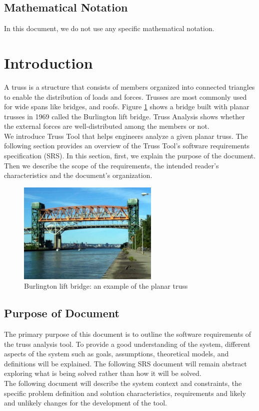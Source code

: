 \documentclass[12pt]{article}
\begin{document}
\subsection{Mathematical Notation}
In this document, we do not use any specific mathematical notation.

\newpage


\section{Introduction}
{A truss is a structure that consists of members organized into connected triangles to enable the distribution of loads and forces. Trusses are most commonly used for wide spans like bridges, and roofs. Figure \ref{Fig_bridge} shows a bridge built with planar trusses in 1969 called the Burlington lift bridge. Truss Analysis shows whether the external forces are well-distributed among the members or not. \\
We introduce Truss Tool that helps engineers analyze a given planar truss. The following section provides an overview of the Truss Tool's software requirements specification (SRS). In this section, first, we explain the purpose of the document. Then we describe the scope of the requirements, the intended reader's characteristics and the document's organization.
}

\begin{figure}[h!]
\begin{center}
 \includegraphics[width=0.6\textwidth]{bridge.jpg}
\caption{Burlington lift bridge: an example of the planar truss}
\label{Fig_bridge} 
\end{center}
\end{figure}

\subsection{Purpose of Document}
{The primary purpose of this document is to outline the software requirements of the truss analysis tool. To provide a good understanding of the system, different aspects of the system such as  goals, assumptions, theoretical models, and definitions will be explained.  The following SRS document will remain abstract exploring what is being solved rather than how it will be solved.\\
The following document will describe the system context and constraints, the specific problem definition and solution characteristics, requirements and likely and unlikely changes for the 
development of the tool.}
\end{document}
